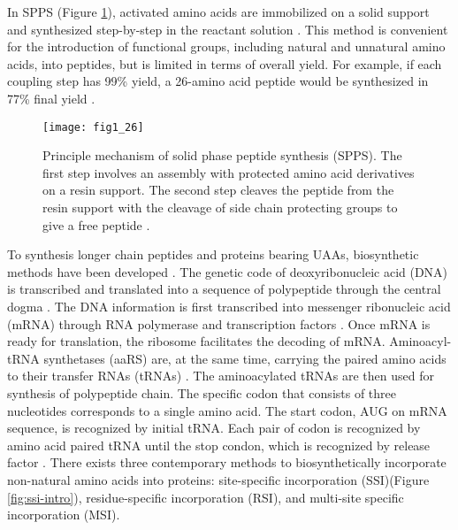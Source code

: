 \begin{refsection}
In SPPS  (Figure \ref{fig:spps-intro}), activated amino acids are
immobilized on a solid support and synthesized step-by-step in the reactant
solution \cite{Merrifield1963a}. This method is convenient for the introduction
of functional groups, including natural and unnatural amino acids, into
peptides, but is limited in terms of overall yield. For example, if each
coupling step has 99\% yield, a 26-amino acid peptide would be synthesized in
77\% final yield \cite{Chan2000}.  
\begin{figure}[h!] \centering \texttt{[image: fig1\_26]}
    \caption[Principle mechanism of solid phase peptide synthesis (SPPS). The
    first step involves an assembly with protected amino acid derivatives on a
resin support. The second step cleaves the peptide from the resin support with
the cleavage of side chain protecting groups to give a free peptide.]{Principle
    mechanism of solid phase peptide synthesis (SPPS). The first step involves
    an assembly with protected amino acid derivatives on a resin support. The
    second step cleaves the peptide from the resin support with the cleavage of
    side chain protecting groups to give a free peptide
    \cite{Merrifield1963a,Mahto2011}.} 
    \label{fig:spps-intro} 
\end{figure}

To synthesis longer chain peptides and proteins bearing UAAs, biosynthetic
methods have been developed
\cite{Voloshchuk2007b,Yoo2007,Johnson2010,Link2003,Voloshchuk2010,Montclare2006b}.
The genetic code of deoxyribonucleic acid (DNA) is transcribed and translated
into a sequence of polypeptide through the central dogma \cite{CRICK1970}. The
DNA information is first transcribed into messenger ribonucleic acid (mRNA)
through RNA polymerase and transcription factors \cite{Pukkila2001}. Once mRNA
is ready for translation, the ribosome facilitates the decoding of mRNA.
Aminoacyl-tRNA synthetases (aaRS) are, at the same time, carrying the paired
amino acids to their transfer RNAs (tRNAs) \cite{Pukkila2001}. The
aminoacylated tRNAs are then used for synthesis of polypeptide chain. The
specific codon that consists of three nucleotides corresponds to a single amino
acid. The start codon, AUG on mRNA sequence, is recognized by initial tRNA.
Each pair of codon is recognized by amino acid paired tRNA \cite{Sadava2006}
until the stop condon, which is recognized by release factor
\cite{Pukkila2001}. There exists three contemporary methods to biosynthetically
incorporate non-natural amino acids into proteins: site-specific incorporation
(SSI)(Figure \ref{fig:ssi-intro}), residue-specific incorporation (RSI), and
multi-site specific incorporation (MSI). 


\end{refsection}
